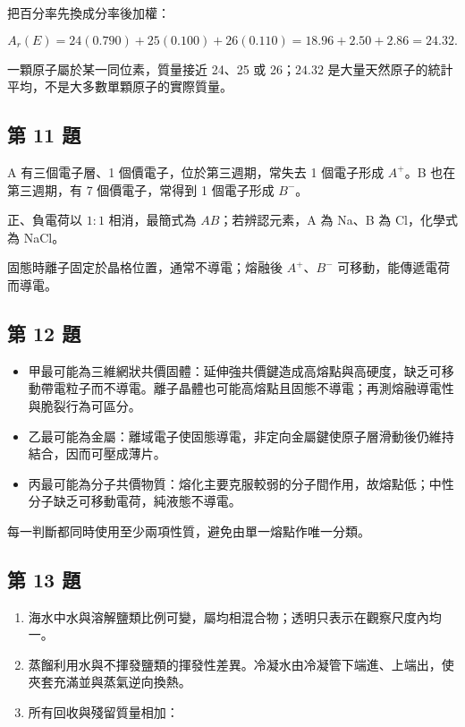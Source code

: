 \documentclass[11pt,a4paper]{article}
\providecommand{\tightlist}{%
  \setlength{\itemsep}{0pt}\setlength{\parskip}{0pt}}
\begin{document}
把百分率先換成分率後加權：

\[
A_r(E)=24(0.790)+25(0.100)+26(0.110)
=18.96+2.50+2.86
=\boxed{24.32}.
\]

一顆原子屬於某一同位素，質量接近 24、25 或 26；\(24.32\) 是大量天然原子的統計平均，不是大多數單顆原子的實際質量。

\subsection{第 11 題}\label{ux7b2c-11-ux984c}

A 有三個電子層、1 個價電子，位於第三週期，常失去 1 個電子形成 \(A^+\)。B 也在第三週期，有 7 個價電子，常得到 1 個電子形成 \(B^-\)。

正、負電荷以 \(1:1\) 相消，最簡式為 \(\boxed{AB}\)；若辨認元素，A 為 Na、B 為 Cl，化學式為 NaCl。

固態時離子固定於晶格位置，通常不導電；熔融後 \(A^+\)、\(B^-\) 可移動，能傳遞電荷而導電。

\subsection{第 12 題}\label{ux7b2c-12-ux984c}

\begin{itemize}
\tightlist
\item
  甲最可能為三維網狀共價固體：延伸強共價鍵造成高熔點與高硬度，缺乏可移動帶電粒子而不導電。離子晶體也可能高熔點且固態不導電；再測熔融導電性與脆裂行為可區分。
\item
  乙最可能為金屬：離域電子使固態導電，非定向金屬鍵使原子層滑動後仍維持結合，因而可壓成薄片。
\item
  丙最可能為分子共價物質：熔化主要克服較弱的分子間作用，故熔點低；中性分子缺乏可移動電荷，純液態不導電。
\end{itemize}

每一判斷都同時使用至少兩項性質，避免由單一熔點作唯一分類。

\subsection{第 13 題}\label{ux7b2c-13-ux984c}

\begin{enumerate}
\def\labelenumi{\arabic{enumi}.}
\tightlist
\item
  海水中水與溶解鹽類比例可變，屬均相混合物；透明只表示在觀察尺度內均一。
\item
  蒸餾利用水與不揮發鹽類的揮發性差異。冷凝水由冷凝管下端進、上端出，使夾套充滿並與蒸氣逆向換熱。
\item
  所有回收與殘留質量相加：
\end{enumerate}
\end{document}

